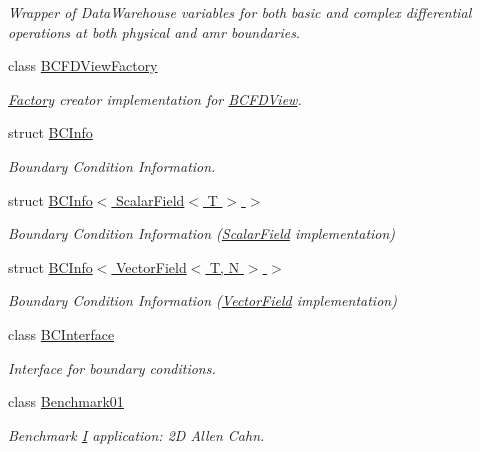 \begin{DoxyCompactItemize}
\begin{DoxyCompactList}\small\item\em Wrapper of Data\+Warehouse variables for both basic and complex differential operations at both physical and amr boundaries. \end{DoxyCompactList}\item 
class \hyperlink{classUintah_1_1PhaseField_1_1BCFDViewFactory}{B\+C\+F\+D\+View\+Factory}
\begin{DoxyCompactList}\small\item\em \hyperlink{classUintah_1_1PhaseField_1_1Factory}{Factory} creator implementation for \hyperlink{classUintah_1_1PhaseField_1_1BCFDView}{B\+C\+F\+D\+View}. \end{DoxyCompactList}\item 
struct \hyperlink{structUintah_1_1PhaseField_1_1BCInfo}{B\+C\+Info}
\begin{DoxyCompactList}\small\item\em Boundary Condition Information. \end{DoxyCompactList}\item 
struct \hyperlink{structUintah_1_1PhaseField_1_1BCInfo_3_01ScalarField_3_01T_01_4_01_4}{B\+C\+Info$<$ Scalar\+Field$<$ T $>$ $>$}
\begin{DoxyCompactList}\small\item\em Boundary Condition Information (\hyperlink{structUintah_1_1PhaseField_1_1ScalarField}{Scalar\+Field} implementation) \end{DoxyCompactList}\item 
struct \hyperlink{structUintah_1_1PhaseField_1_1BCInfo_3_01VectorField_3_01T_00_01N_01_4_01_4}{B\+C\+Info$<$ Vector\+Field$<$ T, N $>$ $>$}
\begin{DoxyCompactList}\small\item\em Boundary Condition Information (\hyperlink{structUintah_1_1PhaseField_1_1VectorField}{Vector\+Field} implementation) \end{DoxyCompactList}\item 
class \hyperlink{structUintah_1_1PhaseField_1_1BCInterface}{B\+C\+Interface}
\begin{DoxyCompactList}\small\item\em Interface for boundary conditions. \end{DoxyCompactList}\item 
class \hyperlink{classUintah_1_1PhaseField_1_1Benchmark01}{Benchmark01}
\begin{DoxyCompactList}\small\item\em Benchmark \hyperlink{structUintah_1_1PhaseField_1_1I}{I} application\+: 2D Allen Cahn. \end{DoxyCompactList}\item 

\end{DoxyCompactItemize}
